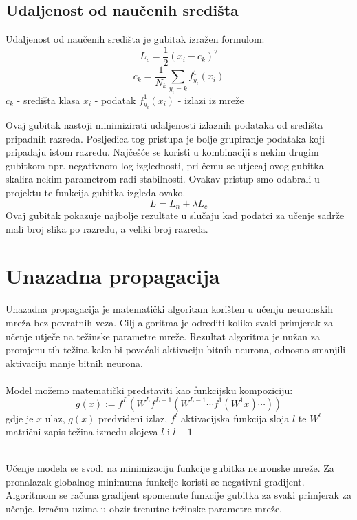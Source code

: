 \subsection{Udaljenost od naučenih središta}
	Udaljenost od naučenih središta je gubitak izražen formulom:
	\[
		L_c = \frac{1}{2} (x_i-c_k)^2
	\]
	\[
		c_k = \frac{1}{N_k}\sum_{y_i=k}f_{y_i}^1(x_i)
	\]
	$c_k$ - središta klasa
	\newline
	$x_i$ - podatak
	\newline
	$f_{y_i}^1(x_i)$ - izlazi iz mreže
	\newline
	
Ovaj gubitak nastoji minimizirati udaljenosti izlaznih podataka od središta pripadnih razreda. Posljedica tog pristupa je bolje grupiranje podataka koji pripadaju istom razredu. Najčešće se koristi u kombinaciji s nekim drugim gubitkom npr. negativnom log-izglednosti, pri čemu se utjecaj ovog gubitka skalira nekim parametrom radi stabilnosti. Ovakav pristup smo odabrali u projektu te funkcija gubitka izgleda ovako.
\[
	L = L_n + \lambda L_c
\]
 Ovaj gubitak pokazuje najbolje rezultate u slučaju kad podatci za učenje sadrže mali broj slika po razredu, a veliki broj razreda.
	 


\section{Unazadna propagacija}

Unazadna propagacija je matematički algoritam korišten u učenju neuronskih mreža bez povratnih veza. Cilj algoritma je odrediti koliko svaki primjerak za učenje utječe na težinske parametre mreže. Rezultat algoritma je nužan za promjenu tih težina kako bi povećali aktivaciju bitnih neurona, odnosno smanjili aktivaciju manje bitnih neurona.\\\\Model možemo matematički predstaviti kao funkcijsku kompoziciju:
	\[g(x):=f^{L}(W^{L}f^{L-1}(W^{L-1}\cdots f^{1}(W^{1}x)\cdots ))\]
	gdje je \(x\) ulaz, \(g(x)\) predviđeni izlaz, \(f^l\) aktivacijska funkcija sloja \(l\) te \(W^l\) matrični zapis težina između slojeva \(l\) i \(l-1\)
	
	\noindent\\Učenje modela se svodi na minimizaciju funkcije gubitka neuronske mreže. Za pronalazak globalnog minimuma funkcije koristi se negativni gradijent. Algoritmom se računa gradijent spomenute funkcije gubitka za svaki primjerak za učenje. Izračun uzima u obzir trenutne težinske parametre mreže.
	
